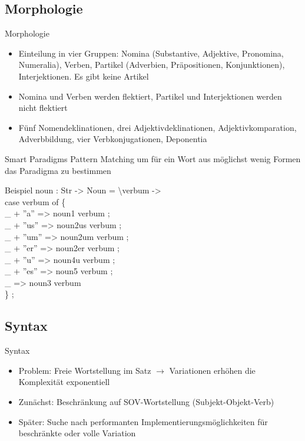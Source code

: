 \documentclass{beamer}
\begin{document}
\subsection{Morphologie}
\begin{frame}{Morphologie}
\begin{itemize}
\item Einteilung in vier Gruppen: Nomina (Substantive, Adjektive, Pronomina, Numeralia), Verben, Partikel (Adverbien, Präpositionen, Konjunktionen), Interjektionen. Es gibt keine Artikel
\item Nomina und Verben werden flektiert, Partikel und Interjektionen werden nicht flektiert
\item Fünf Nomendeklinationen, drei Adjektivdeklinationen, Adjektivkomparation, Adverbbildung, vier Verbkonjugationen, Deponentia
\end{itemize}
\end{frame}
\begin{frame}{Smart Paradigms}
Pattern Matching um für ein Wort aus möglichst wenig Formen das Paradigma zu bestimmen
\begin{block}{Beispiel}
{\scriptsize\ttfamily
  noun : Str -> Noun = \textbackslash verbum ->  \\
    case verbum of \{ \\
      \_ + ''a''  => noun1 verbum ; \\
      \_ + ''us'' => noun2us verbum ; \\
      \_ + ''um'' => noun2um verbum ; \\
      \_ + ''er'' => noun2er verbum ;  \\
      \_ + ''u''  => noun4u verbum ;  \\
      \_ + ''es'' => noun5 verbum ;  \\
      \_  => noun3 verbum \\
      \} ; 
}
\end{block}
\end{frame}
\subsection{Syntax}
\begin{frame}{Syntax}
\begin{itemize}
\item Problem: Freie Wortstellung im Satz $\rightarrow$ Variationen erhöhen die Komplexität exponentiell
\item Zunächst: Beschränkung auf SOV-Wortstellung (Subjekt-Objekt-Verb)
\item Später: Suche nach performanten Implementierungsmöglichkeiten für beschränkte oder volle Variation
\end{itemize}
\end{frame}
\end{document}
